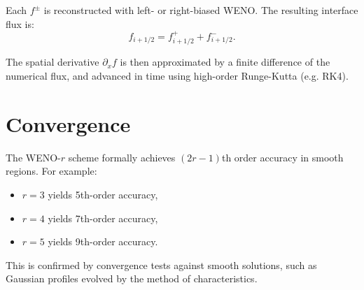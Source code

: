 \documentclass{article}
\begin{document}
Each $f^\pm$ is reconstructed with left- or right-biased WENO. The resulting interface flux is:
\[
f_{i+1/2} = f^+_{i+1/2} + f^-_{i+1/2}.
\]

The spatial derivative $\partial_x f$ is then approximated by a finite difference of the numerical flux, and advanced in time using high-order Runge-Kutta (e.g. RK4).

\section*{Convergence}

The WENO-$r$ scheme formally achieves $(2r-1)$th order accuracy in smooth regions. For example:
\begin{itemize}
    \item $r=3$ yields 5th-order accuracy,
    \item $r=4$ yields 7th-order accuracy,
    \item $r=5$ yields 9th-order accuracy.
\end{itemize}

This is confirmed by convergence tests against smooth solutions, such as Gaussian profiles evolved by the method of characteristics.
\end{document}
